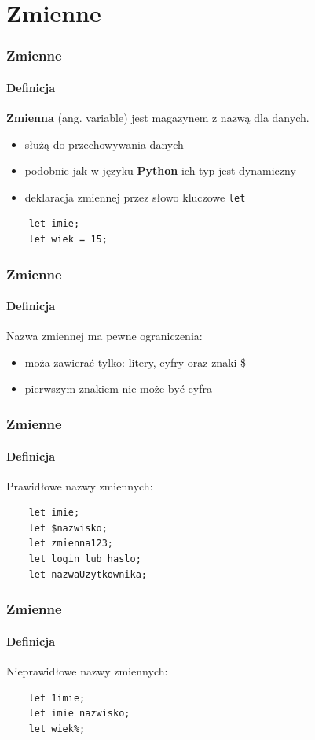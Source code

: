 \section{Zmienne}

\begin{frame}[fragile]
  \frametitle{Zmienne}
  \framesubtitle{Definicja}

  \textbf{Zmienna} (ang. variable) jest magazynem z nazwą dla danych.

  \begin{itemize}
    \item służą do przechowywania danych
    \item podobnie jak w języku \textbf{Python} ich typ jest dynamiczny
    \item deklaracja zmiennej przez słowo kluczowe \verb|let|
  \end{itemize}

  \begin{verbatim}
    let imie;
    let wiek = 15;
  \end{verbatim}
\end{frame}


\begin{frame}[fragile]
  \frametitle{Zmienne}
  \framesubtitle{Definicja}

  Nazwa zmiennej ma pewne ograniczenia:

  \begin{itemize}
    \item moża zawierać tylko: litery, cyfry oraz znaki \$ \_
    \item pierwszym znakiem nie może być cyfra
  \end{itemize}
\end{frame}

\begin{frame}[fragile]
  \frametitle{Zmienne}
  \framesubtitle{Definicja}

  Prawidłowe nazwy zmiennych:
  \begin{verbatim}
    let imie;
    let $nazwisko;
    let zmienna123;
    let login_lub_haslo;
    let nazwaUzytkownika;
  \end{verbatim}
\end{frame}


\begin{frame}[fragile]
  \frametitle{Zmienne}
  \framesubtitle{Definicja}

  Nieprawidłowe nazwy zmiennych:
  \begin{verbatim}
    let 1imie;
    let imie nazwisko;
    let wiek%;
  \end{verbatim}
\end{frame}

